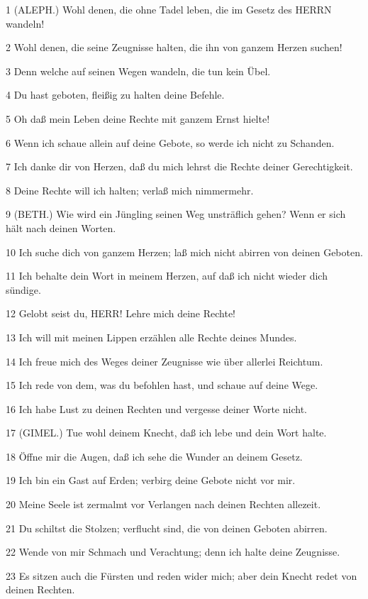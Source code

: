 \par 1 (ALEPH.) Wohl denen, die ohne Tadel leben, die im Gesetz des HERRN wandeln!
\par 2 Wohl denen, die seine Zeugnisse halten, die ihn von ganzem Herzen suchen!
\par 3 Denn welche auf seinen Wegen wandeln, die tun kein Übel.
\par 4 Du hast geboten, fleißig zu halten deine Befehle.
\par 5 Oh daß mein Leben deine Rechte mit ganzem Ernst hielte!
\par 6 Wenn ich schaue allein auf deine Gebote, so werde ich nicht zu Schanden.
\par 7 Ich danke dir von Herzen, daß du mich lehrst die Rechte deiner Gerechtigkeit.
\par 8 Deine Rechte will ich halten; verlaß mich nimmermehr.
\par 9 (BETH.) Wie wird ein Jüngling seinen Weg unsträflich gehen? Wenn er sich hält nach deinen Worten.
\par 10 Ich suche dich von ganzem Herzen; laß mich nicht abirren von deinen Geboten.
\par 11 Ich behalte dein Wort in meinem Herzen, auf daß ich nicht wieder dich sündige.
\par 12 Gelobt seist du, HERR! Lehre mich deine Rechte!
\par 13 Ich will mit meinen Lippen erzählen alle Rechte deines Mundes.
\par 14 Ich freue mich des Weges deiner Zeugnisse wie über allerlei Reichtum.
\par 15 Ich rede von dem, was du befohlen hast, und schaue auf deine Wege.
\par 16 Ich habe Lust zu deinen Rechten und vergesse deiner Worte nicht.
\par 17 (GIMEL.) Tue wohl deinem Knecht, daß ich lebe und dein Wort halte.
\par 18 Öffne mir die Augen, daß ich sehe die Wunder an deinem Gesetz.
\par 19 Ich bin ein Gast auf Erden; verbirg deine Gebote nicht vor mir.
\par 20 Meine Seele ist zermalmt vor Verlangen nach deinen Rechten allezeit.
\par 21 Du schiltst die Stolzen; verflucht sind, die von deinen Geboten abirren.
\par 22 Wende von mir Schmach und Verachtung; denn ich halte deine Zeugnisse.
\par 23 Es sitzen auch die Fürsten und reden wider mich; aber dein Knecht redet von deinen Rechten.
